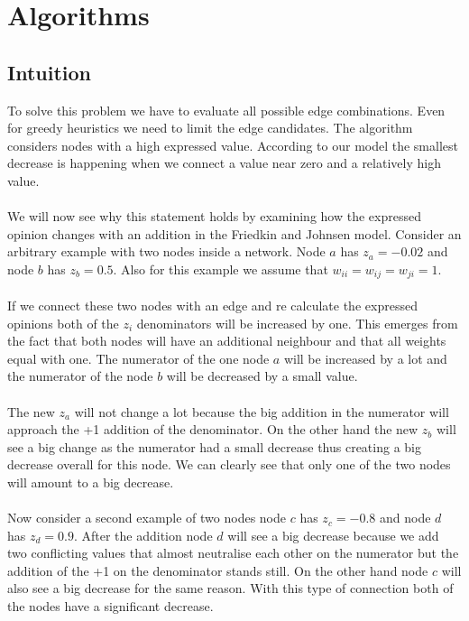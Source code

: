 \chapter{Algorithms}
\label{ch:algorithms}



\section{Intuition}
\label{sec:intuition}

To solve this problem we have to evaluate all possible edge combinations. Even for greedy heuristics we need to limit the edge candidates. The algorithm considers nodes with a high expressed value. According to our model the smallest decrease is happening when we connect a value near zero and a relatively high value.
\\
\\
We will now see why this statement holds by examining how the expressed opinion changes with an addition in the Friedkin and Johnsen model. Consider an arbitrary example with two nodes inside a network. Node $a$ has $z_a = -0.02$ and node $b$ has $z_b = 0.5$. Also for this example we assume that $w_{ii}=w_{ij}=w_{ji}=1$. 
\\
\\
If we connect these two nodes with an edge and re calculate the expressed opinions both of the $z_i$ denominators will be increased by one. This emerges from the fact that both nodes will have an additional neighbour and that all weights equal with one. The numerator of the one node $a$ will be increased by a lot and the numerator of the node $b$ will be decreased by a small value.
\\
\\
The new $z_a$ will not change a lot because the big addition in the numerator will approach the +1 addition of the denominator. On the other hand the new $z_b$ will see a big change as the numerator had a small decrease thus creating a big decrease overall for this node. We can clearly see that only one of the two nodes will amount to a big decrease. 
\\
\\
Now consider a second example of two nodes node $c$ has $z_c = -0.8$ and node $d$ has $z_d = 0.9$. After the addition node $d$ will see a big decrease because we add two conflicting values that almost neutralise each other on the numerator but the addition of the +1 on the denominator stands still. On the other hand node $c$ will also see a big decrease for the same reason. With this type of connection both of the nodes have a significant decrease.
\\
